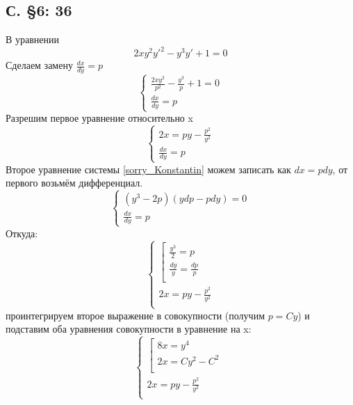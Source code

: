 \documentclass{article}
\begin{document}
\subsection{С. \S6: 36 } 
В уравнении 
\begin{equation}
    2 x y^2 y'^2 - y^3 y' + 1 = 0
\end{equation}
Сделаем замену $\frac{d x}{d y}=p$
\begin{equation}
\begin{cases}
    \frac{2 x y^2 }{p^2} - \frac{y^3}{p} + 1 = 0\\
    \frac{d x}{d y}=p
\end{cases}
\end{equation}
Разрешим первое уравнение относительно x 
\begin{equation} \label{sorry_Konstantin}
\begin{cases}
    2 x =p y - \frac{p^2 }{y^2} \\
    \frac{d x}{d y}=p
\end{cases}
\end{equation}
Второе уравнение системы \ref{sorry_Konstantin} можем записать как $dx = p dy$, от первого возьмём дифференциал.
\begin{equation}
\begin{cases}
    (y^3-2p)(y d p - p d y)=0 \\
    \frac{d x}{d y}=p
\end{cases}
\end{equation}
Откуда:
\begin{equation}
\begin{cases}
\left[
\begin{gathered}
    \frac{y^3}{2}=p\\
    \frac{d y}{y} = \frac{d p}{p} \\
\end{gathered}
\right. \\
    2 x =p y - \frac{p^2 }{y^2} \\
\end{cases}
\end{equation}
проинтегрируем второе выражение в совокупности (получим $p=C y$) и подставим оба уравнения совокупности в уравнение на x:
\begin{equation}
    \begin{cases}
    \left[
    \begin{gathered}
        8x=y^4\\
        2x=C y^2 - C^2 \\
    \end{gathered}\right. \\
        2 x =p y - \frac{p^2 }{y^2} \\
    \end{cases}
\end{equation}
\end{document}
